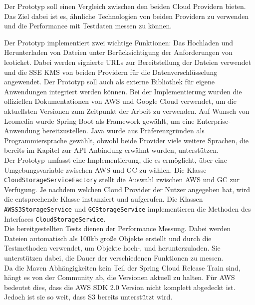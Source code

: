 Der Prototyp soll einen Vergleich zwischen den beiden Cloud Providern bieten. Das Ziel dabei ist es, ähnliche Technologien von beiden Providern zu verwenden und die Performance mit Testdaten messen zu können. 

Der Prototyp implementiert zwei wichtige Funktionen: Das Hochladen und Herunterladen von Dateien unter Berücksichtigung der Anforderungen von leoticket. Dabei werden signierte URLs zur Bereitstellung der Dateien verwendet und die SSE KMS von beiden Providern für die Datenverschlüsselung angewendet. Der Prototyp soll auch als externe Bibliothek für eigene Anwendungen integriert werden können. Bei der Implementierung wurden die offiziellen Dokumentationen von AWS und Google Cloud verwendet, um die aktuellsten Versionen zum Zeitpunkt der Arbeit zu verwenden. Auf Wunsch von Leomedia wurde Spring Boot als Framework gewählt, um eine Enterprise-Anwendung bereitzustellen. Java wurde aus Präferenzgründen als Programmiersprache gewählt, obwohl beide Provider viele weitere Sprachen, die bereits im Kapitel zur API-Anbindung erwähnt wurden, unterstützen.\\

Der Prototyp umfasst eine Implementierung, die es ermöglicht, über eine Umgebungsvariable zwischen AWS und GC zu wählen. Die Klasse \verb|CloudStorageServiceFactory| stellt die Auswahl zwischen AWS und GC zur Verfügung. Je nachdem welchen Cloud Provider der Nutzer angegeben hat, wird die entsprechende Klasse instanziert und aufgerufen. Die Klassen \verb|AWSS3StorageService| und \verb|GCStorageService| implementieren die Methoden des Interfaces \verb|CloudStorageService|.\\

Die bereitgestellten Tests dienen der Performance Messung. Dabei werden Dateien automatisch als 100kb große Objekte erstellt und durch die Testmethoden verwendet, um Objekte hoch-, und herunterzuladen. Sie unterstützen dabei, die Dauer der verschiedenen Funktionen zu messen.\\

Da die Maven Abhängigkeiten kein Teil der Spring Cloud Release Train sind, hängt es von der Community ab, die Versionen aktuell zu halten. Für AWS bedeutet dies, dass die AWS SDK 2.0 Version nicht komplett abgedeckt ist. Jedoch ist sie so weit, dass S3 bereits unterstützt wird. 